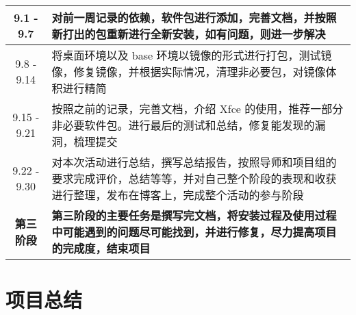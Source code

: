 \documentclass[letterpaper,12pt]{article}
\begin{document}
\begin{table}[!ht]
\begin{tabularx}{\textwidth}{|c|X|}
    9.1 - 9.7   & 对前一周记录的依赖，软件包进行添加，完善文档，并按照新打出的包重新进行全新安装，如有问题，则进一步解决                                                        \\ \hline
    9.8 - 9.14  & 将桌面环境以及 base 环境以镜像的形式进行打包，测试镜像，修复镜像，并根据实际情况，清理非必要包，对镜像体积进行精简                                               \\ \hline
    9.15 - 9.21 & 按照之前的记录，完善文档，介绍 Xfce 的使用，推荐一部分非必要软件包。进行最后的测试和总结，修复能发现的漏洞，梳理提交                                              \\ \hline
    9.22 - 9.30 & 对本次活动进行总结，撰写总结报告，按照导师和项目组的要求完成评价，总结等等，并对自己整个阶段的表现和收获进行整理，发布在博客上，完成整个活动的参与阶段                                \\ \hline
    \textbf{第三阶段}    & \textbf{第三阶段的主要任务是撰写完文档，将安装过程及使用过程中可能遇到的问题尽可能找到，并进行修复，尽力提高项目的完成度，结束项目} \\ \hline
    \end{tabularx}
\end{table}

\newpage

\section{项目总结}
\end{document}
